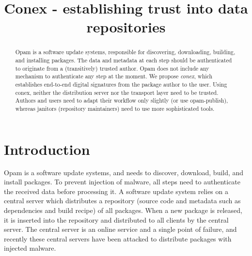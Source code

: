\documentclass[nocopyrightspace]{sigplanconf}
\begin{document}
\setlength{\pdfpageheight}{\paperheight}
\setlength{\pdfpagewidth}{\paperwidth}

\title{Conex - establishing trust into data repositories}


\date{}

\maketitle

\begin{abstract}
  Opam is a software update systems, responsible for discovering, downloading, building, and installing packages.
  The data and metadata at each step should be authenticated to originate from a (transitively) trusted author.
  Opam does not include any mechanism to authenticate any step at the moment.
  We propose \emph{conex}, which establishes end-to-end digital signatures from the package author to the user.
  Using conex, neither the distribution server nor the transport layer need to be trusted.
  Authors and users need to adapt their workflow only slightly (or use opam-publish), whereas janitors (repository maintainers) need to use more sophisticated tools.
\end{abstract}

\section{Introduction}
Opam is a software update systems, and needs to discover, download, build, and install packages.
To prevent injection of malware, all steps need to authenticate the received data before processing it.
A software update system relies on a central server which distributes a repository (source code and metadata such as dependencies and build recipe) of all packages.
When a new package is released, it is inserted into the repository and distributed to all clients by the central server.
The central server is an online service and a single point of failure, and recently these central servers have been attacked \cite{adobe,apache2,apache1,opera,kernel,cabal,kernelorg,debian,freebsd,php3,savannah,maven,savannah2,npm,php,phpmyadmin,php2,github,ocamlforge,redhatssh,gentoo,rubygems,fedora,wordpress} to distribute packages with injected malware.
\end{document}
